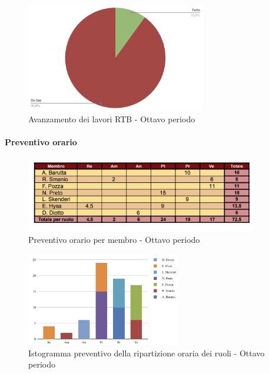 \begin{figure}[H]
    \centering
    \begin{minipage}[b]{0.70\textwidth}
        \centering
        \includegraphics[width=0.7\textwidth]{../Images/torta8.png}
        \caption{Avanzamento dei lavori RTB - Ottavo periodo}
        \label{fig:Avanzamento_RTB_8}
    \end{minipage}
\end{figure}

\paragraph{Preventivo orario}

\begin{figure}[H] 
    \centering
    \includegraphics[width=0.9\textwidth]{../Images/tabPrev8.png}
    \caption{Preventivo orario per membro - Ottavo periodo}
    \label{fig:Preventivo_orario_8}
\end{figure}

\begin{figure}[H]
    \centering
    \includegraphics[width=0.6\textwidth]{../Images/graficoPrev8.png}
    \caption{Istogramma preventivo della ripartizione oraria dei ruoli - Ottavo periodo}
    \label{fig:Preventivo_ripartizione_oraria_8}
\end{figure}

